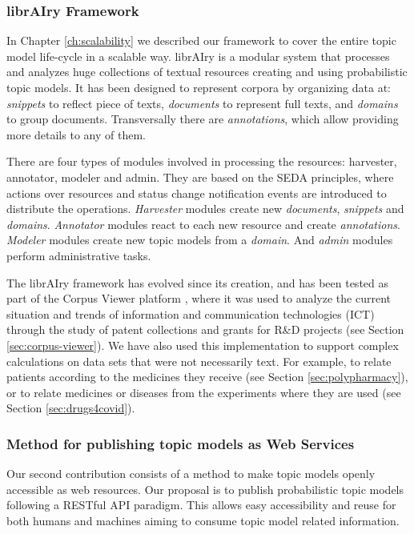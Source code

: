 \subsubsection{librAIry Framework}

In Chapter \ref{ch:scalability} we described our framework to cover the entire topic model life-cycle in a scalable way. librAIry is a modular system that processes and analyzes huge collections of textual resources creating and using probabilistic topic models. It has been designed to represent corpora by organizing data at: \textit{snippets} to reflect piece of texts, \textit{documents} to represent full texts, and \textit{domains} to group documents. Transversally there are \textit{annotations}, which allow providing more details to any of them.

There are four types of modules involved in processing the resources: harvester, annotator, modeler and admin. They are based on the SEDA principles, where actions over resources and status change notification events are introduced to distribute the operations. \textit{Harvester} modules create new \textit{documents}, \textit{snippets} and \textit{domains}. \textit{Annotator} modules react to each new resource and create \textit{annotations}. \textit{Modeler} modules create new topic models from a \textit{domain}. And \textit{admin} modules perform administrative tasks.

The librAIry framework has evolved since its creation, and has been tested as part of the Corpus Viewer platform \citep{Samy2019}, where it was used to analyze the current situation and trends of information and communication technologies (ICT) through the study of patent collections and grants for R\&D projects (see Section \ref{sec:corpus-viewer}). We have also used this implementation to support complex calculations on data sets that were not necessarily text. For example, to relate patients according to the medicines they receive \citep{Badenes-Olmedo2019c} (see Section 	\ref{sec:polypharmacy}), or to relate medicines or diseases from the experiments where they are used (see Section \ref{sec:drugs4covid}).

\subsubsection{Method for publishing topic models as Web Services}

Our second contribution consists of a method to make topic models openly accessible as web resources. Our proposal is to publish probabilistic topic models following a RESTful API paradigm. This allows easy accessibility and reuse for both humans and machines aiming to consume topic model related information.

